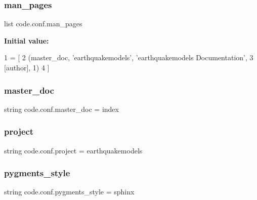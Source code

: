 \subsubsection{\texorpdfstring{man\+\_\+pages}{man\_pages}}
{\footnotesize\ttfamily list code.\+conf.\+man\+\_\+pages}

{\bfseries Initial value\+:}
\begin{DoxyCode}
1 =  [
2     (master\_doc, \textcolor{stringliteral}{'earthquakemodels'}, \textcolor{stringliteral}{'earthquakemodels Documentation'},
3      [author], 1)
4 ]
\end{DoxyCode}
\mbox{\label{namespacecode_1_1conf_ac5621fb0c9fa22cf292b66d02f227779}} 
\subsubsection{\texorpdfstring{master\+\_\+doc}{master\_doc}}
{\footnotesize\ttfamily string code.\+conf.\+master\+\_\+doc = \textquotesingle{}index\textquotesingle{}}

\mbox{\label{namespacecode_1_1conf_acc0ab2b4d42948c6aa1ceb6fa10a46ca}} 
\subsubsection{\texorpdfstring{project}{project}}
{\footnotesize\ttfamily string code.\+conf.\+project = \textquotesingle{}earthquakemodels\textquotesingle{}}

\mbox{\label{namespacecode_1_1conf_a2ee5a64893667d005d3dec8eb590589e}} 
\subsubsection{\texorpdfstring{pygments\+\_\+style}{pygments\_style}}
{\footnotesize\ttfamily string code.\+conf.\+pygments\+\_\+style = \textquotesingle{}sphinx\textquotesingle{}}

\mbox{\label{namespacecode_1_1conf_af30e2633929d9fc903b73063cd5a518f}} 
